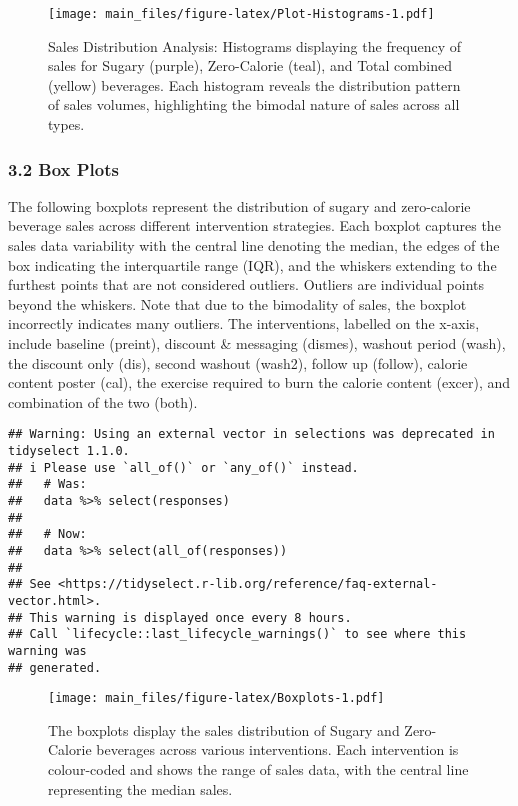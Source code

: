 \documentclass[
]{article}
\begin{document}
\begin{figure}
\centering
\texttt{[image: main\_files/figure-latex/Plot-Histograms-1.pdf]}
\caption{Sales Distribution Analysis: Histograms displaying the
frequency of sales for Sugary (purple), Zero-Calorie (teal), and Total
combined (yellow) beverages. Each histogram reveals the distribution
pattern of sales volumes, highlighting the bimodal nature of sales
across all types.}
\end{figure}

\hypertarget{box-plots}{%
\subsubsection{3.2 Box Plots}\label{box-plots}}

The following boxplots represent the distribution of sugary and
zero-calorie beverage sales across different intervention strategies.
Each boxplot captures the sales data variability with the central line
denoting the median, the edges of the box indicating the interquartile
range (IQR), and the whiskers extending to the furthest points that are
not considered outliers. Outliers are individual points beyond the
whiskers. Note that due to the bimodality of sales, the boxplot
incorrectly indicates many outliers. The interventions, labelled on the
x-axis, include baseline (preint), discount \& messaging (dismes),
washout period (wash), the discount only (dis), second washout (wash2),
follow up (follow), calorie content poster (cal), the exercise required
to burn the calorie content (excer), and combination of the two (both).

\begin{verbatim}
## Warning: Using an external vector in selections was deprecated in tidyselect 1.1.0.
## i Please use `all_of()` or `any_of()` instead.
##   # Was:
##   data %>% select(responses)
## 
##   # Now:
##   data %>% select(all_of(responses))
## 
## See <https://tidyselect.r-lib.org/reference/faq-external-vector.html>.
## This warning is displayed once every 8 hours.
## Call `lifecycle::last_lifecycle_warnings()` to see where this warning was
## generated.
\end{verbatim}

\begin{figure}
\centering
\texttt{[image: main\_files/figure-latex/Boxplots-1.pdf]}
\caption{The boxplots display the sales distribution of Sugary and
Zero-Calorie beverages across various interventions. Each intervention
is colour-coded and shows the range of sales data, with the central line
representing the median sales.}
\end{figure}
\end{document}
